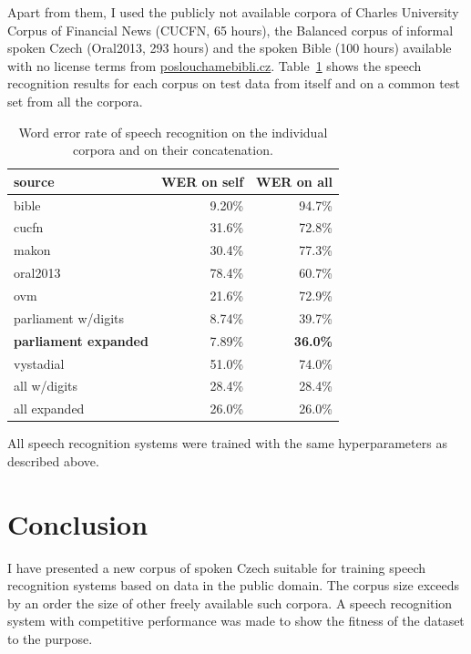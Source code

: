\documentclass[conference]{IEEEtran}
\begin{document}
Apart from them, I used the publicly not available corpora of Charles University
Corpus of Financial News (CUCFN, 65 hours)\cite{byrne1999large}, the Balanced
corpus of informal spoken Czech (Oral2013, 293 hours)\cite{oral2013} and the
spoken Bible (100 hours) available with no license terms from
\url{poslouchamebibli.cz}. Table~\ref{tab:csasr:results} shows the speech recognition
results for each corpus on test data from itself and on a common test set from
all the corpora.

\begin{table}[htpb]
\caption{Word error rate of speech recognition on the individual corpora and on
their concatenation.}
\centering
\begin{tabular}{|l||r|r|}
\hline
source    & WER on self & WER on all \\
\hline
bible     & 9.20\%  & 94.7\% \\
cucfn     & 31.6\%  & 72.8\% \\
makon     & 30.4\%  & 77.3\% \\
oral2013  & 78.4\%  & 60.7\% \\
ovm       & 21.6\%  & 72.9\% \\
parliament w/digits
          & 8.74\%  & 39.7\% \\
\textbf{parliament expanded}
          & 7.89\%  & \textbf{36.0\%} \\
vystadial & 51.0\%  & 74.0\% \\
\hline
all w/digits & 28.4\% & 28.4\% \\
all expanded & 26.0\% & 26.0\% \\
\hline
\end{tabular}
\label{tab:csasr:results}
\end{table}

All speech recognition systems were trained with the same hyperparameters as
described above.%

\section{Conclusion}

I have presented a new corpus of spoken Czech suitable for training speech
recognition systems based on data in the public domain. The corpus size exceeds
by an order the size of other freely available such corpora. A speech
recognition system with competitive performance was made to show the fitness
of the dataset to the purpose.
\end{document}
